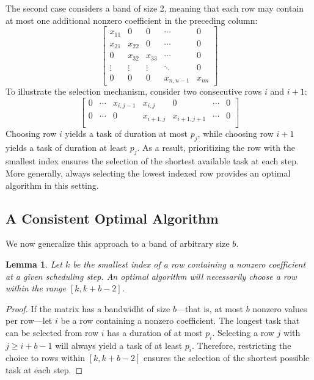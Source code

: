 \documentclass{article}
\newtheorem{lemma}{Lemma}
\begin{document}
The second case considers a band of size 2, meaning that each row may contain at most one additional nonzero coefficient in the preceding column:  
\[
\begin{bmatrix}  
x_{11} & 0 & 0 & \cdots & 0 \\  
x_{21} & x_{22} & 0 & \cdots & 0 \\  
0 & x_{32} & x_{33} & \cdots & 0 \\  
\vdots & \vdots & \vdots & \ddots & 0 \\  
0 & 0 & 0 & x_{n,n-1} & x_{nn}  
\end{bmatrix}  
\]
To illustrate the selection mechanism, consider two consecutive rows $i$ and $i+1$:\[
\begin{bmatrix}  
0 & \cdots & x_{i, j-1} & x_{i,j} & 0 & \cdots & 0 \\  
0 & \cdots & 0 & x_{i+1, j} & x_{i+1, j+1} & \cdots & 0 \\  
\end{bmatrix}  
\]
Choosing row $i$ yields a task of duration at most $p_j$, while choosing row $i+1$ yields a task of duration at least $p_j$. As a result, prioritizing the row with the smallest index ensures the selection of the shortest available task at each step. More generally, always selecting the lowest indexed row provides an optimal algorithm in this setting.
\subsection{A Consistent Optimal Algorithm}\label{band-consistent-algo}

We now generalize this approach to a band of arbitrary size $b$.

\begin{lemma}\label{lemma:rowforDP}
Let $k$ be the smallest index of a row containing a nonzero coefficient at a given scheduling step. An optimal algorithm will necessarily choose a row within the range $[k, k + b - 2]$.
\end{lemma}

\begin{proof}
If the matrix has a bandwidht of size $b$—that is, at most $b$ nonzero values per row—let $i$ be a row containing a nonzero coefficient. The longest task that can be selected from row $i$ has a duration of at most $p_i$. Selecting a row $j$ with $j \geq i + b - 1$ will always yield a task of at least $p_i$. Therefore, restricting the choice to rows within $[k, k + b - 2]$ ensures the selection of the shortest possible task at each step.
\end{proof}
\end{document}
